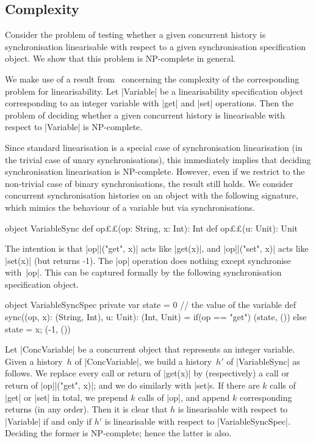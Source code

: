 
\subsection{Complexity}
\label{sec:NP-complete}

Consider the problem of testing whether a given concurrent history is
synchronisation linearisable with respect to a given synchronisation
specification object.  We show that this problem is NP-complete in general.

We make use of a result from~\cite{gibbons-korach} concerning the complexity
of the corresponding problem for linearisability.  Let |Variable| be a
linearisability specification object corresponding to an integer variable with
|get| and |set| operations.  Then the problem of deciding whether a given
concurrent history is linearisable with respect to |Variable| is NP-complete.

Since standard linearisation is a special case of synchronisation
linearisation (in the trivial case of unary synchronisations), this
immediately implies that deciding synchronisation linearisation is
NP-complete.  However, even if we restrict to the non-trivial case of binary
synchronisations, the result still holds.
%
We consider concurrent synchronisation histories on an object with the
following signature, which mimics the behaviour of a variable but via
synchronisations. 
%
\begin{scala}
object VariableSync{
  def op££(op: String, x: Int): Int
  def op££(u: Unit): Unit
} 
\end{scala}
%
The intention is that |op||("get", x)| acts like |get(x)|, and
|op||("set", x)| acts like |set(x)| (but returns -1).  The |op|
operation does nothing except synchronise with~|op|.  This
can be captured formally by the following synchronisation specification
object.
%
\begin{scala}
object VariableSyncSpec{
  private var state = 0   // the value of the variable
  def sync((op, x): (String, Int), u: Unit): (Int, Unit) = 
    if(op == "get") (state, ()) else{ state = x; (-1, ()) }
}
\end{scala}

Let |ConcVariable| be a concurrent object that represents an integer variable.
Given a history~$h$ of |ConcVariable|, we build a history~$h'$ of
|VariableSync| as follows.  We replace every call or return of |get(x)| by
(respectively) a call or return of |op||("get", x)|; and we do similarly
with |set|s.  If there are $k$ calls of |get| or |set| in total, we prepend
$k$ calls of |op|, and append $k$ corresponding returns (in any order).
%
Then it is clear that $h$ is linearisable with respect to |Variable| if and
only if $h'$ is linearisable with respect to |VariableSyncSpec|.  Deciding the
former is NP-complete; hence the latter is also. 


